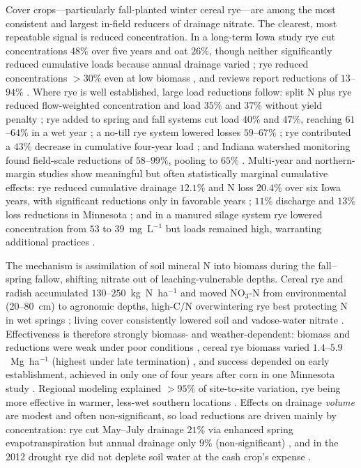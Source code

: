 \documentclass[11pt]{article}
\begin{document}
Cover crops---particularly fall-planted winter cereal rye---are among the
most consistent and largest in-field reducers of drainage nitrate. The
clearest, most repeatable signal is reduced concentration. In a long-term
Iowa study rye cut concentrations $48\%$ over five years and oat $26\%$,
though neither significantly reduced cumulative loads because annual drainage
varied \parencite{Kaspar2012}; rye reduced concentrations $>30\%$ even at low
biomass \parencite{Waring2020}, and reviews report reductions of
$13$--$94\%$ \parencite{Ward2018}. Where rye is well established, large load
reductions follow: split N plus rye reduced flow-weighted concentration and
load $35\%$ and $37\%$ without yield penalty \parencite{PrezaFontes2021}; rye
added to spring and fall systems cut load $40\%$ and $47\%$, reaching
$61$--$64\%$ in a wet year \parencite{Ruffatti2019}; a no-till rye system
lowered losses $59$--$67\%$ \parencite{OBrien2022}; rye contributed a $43\%$
decrease in cumulative four-year load \parencite{Gentry2024}; and Indiana
watershed monitoring found field-scale reductions of $58$--$99\%$, pooling to
$65\%$ \parencite{Vincent2025}. Multi-year and northern-margin studies show
meaningful but often statistically marginal cumulative effects: rye reduced
cumulative drainage $12.1\%$ and N loss $20.4\%$ over six Iowa years, with
significant reductions only in favorable years \parencite{MartinezFeria2016};
$11\%$ discharge and $13\%$ loss reductions in Minnesota \parencite{Strock2004};
and in a manured silage system rye lowered concentration from $53$ to
$39$~mg~L$^{-1}$ but loads remained high, warranting additional practices
\parencite{Krueger2013}.

The mechanism is assimilation of soil mineral N into biomass during the
fall--spring fallow, shifting nitrate out of leaching-vulnerable depths.
Cereal rye and radish accumulated $130$--$250$~kg~N~ha$^{-1}$ and moved
NO$_3$-N from environmental (20--80~cm) to agronomic depths, high-C/N
overwintering rye best protecting N in wet springs \parencite{Lacey2015};
living cover consistently lowered soil and vadose-water nitrate
\parencite{Bosompemaa2021,Strock2004,Qi2011b}. Effectiveness is therefore
strongly biomass- and weather-dependent: biomass and reductions were weak
under poor conditions \parencite{PrezaFontes2021,OBrien2022}, cereal rye
biomass varied $1.4$--$5.9$~Mg~ha$^{-1}$ (highest under late termination)
\parencite{Gentry2025,Birru2023}, and success depended on early establishment,
achieved in only one of four years after corn in one Minnesota study
\parencite{Strock2004,Bawa2023}. Regional modeling explained $>95\%$ of
site-to-site variation, rye being more effective in warmer, less-wet southern
locations \parencite{Malone2014b}. Effects on drainage \emph{volume} are
modest and often non-significant, so load reductions are driven mainly by
concentration: rye cut May--July drainage $21\%$ via enhanced spring
evapotranspiration but annual drainage only $9\%$ (non-significant)
\parencite{Qi2010b,Qi2011b}, and in the 2012 drought rye did not deplete soil
water at the cash crop's expense \parencite{Daigh2014b}.
\end{document}
